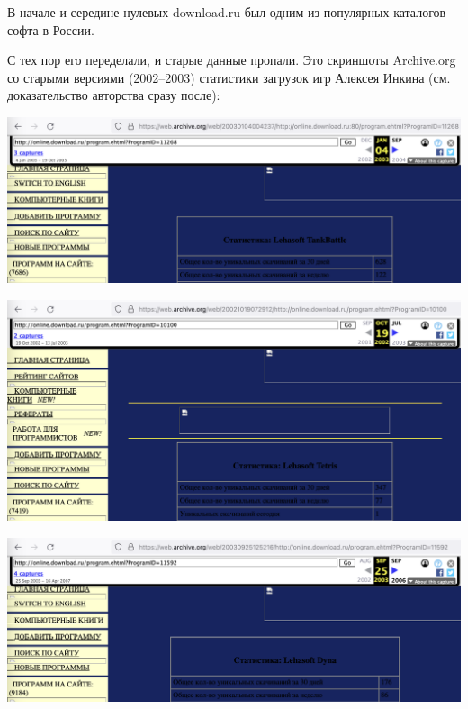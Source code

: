 
В начале и середине нулевых
download.ru был одним из популярных каталогов софта в России.

С тех пор его переделали, и старые данные пропали.
Это скриншоты Archive.org со старыми версиями (2002--2003)
статистики загрузок игр Алексея Инкина
(см. доказательство авторства сразу после):





\includegraphics[width=40em]{tankbattle-downloads}

\includegraphics[width=40em]{tetris-downloads}

\includegraphics[width=40em]{dyna-downloads}


